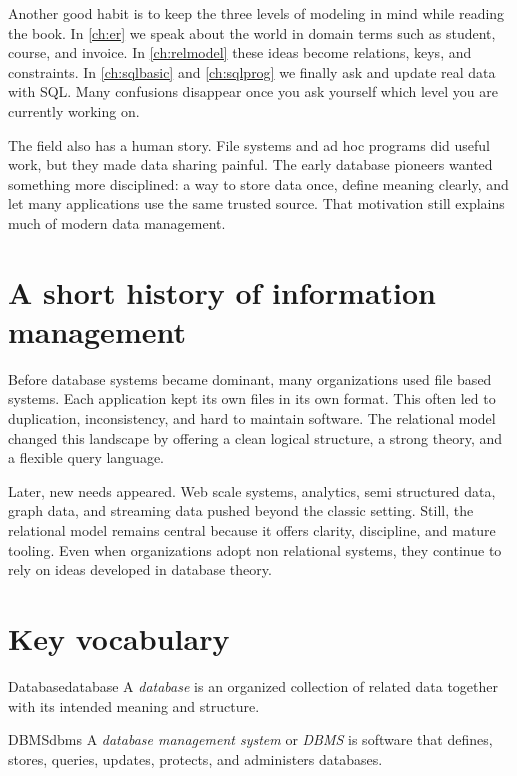 \documentclass[11pt,a4paper,openany]{book}
\begin{document}
Another good habit is to keep the three levels of modeling in mind while reading the book. In \cref{ch:er} we speak about the world in domain terms such as student, course, and invoice. In \cref{ch:relmodel} these ideas become relations, keys, and constraints. In \cref{ch:sqlbasic} and \cref{ch:sqlprog} we finally ask and update real data with SQL. Many confusions disappear once you ask yourself which level you are currently working on.

The field also has a human story. File systems and ad hoc programs did useful work, but they made data sharing painful. The early database pioneers wanted something more disciplined: a way to store data once, define meaning clearly, and let many applications use the same trusted source. That motivation still explains much of modern data management.

\section{A short history of information management}
Before database systems became dominant, many organizations used file based systems. Each application kept its own files in its own format. This often led to duplication, inconsistency, and hard to maintain software. The relational model changed this landscape by offering a clean logical structure, a strong theory, and a flexible query language.

Later, new needs appeared. Web scale systems, analytics, semi structured data, graph data, and streaming data pushed beyond the classic setting. Still, the relational model remains central because it offers clarity, discipline, and mature tooling. Even when organizations adopt non relational systems, they continue to rely on ideas developed in database theory.

\section{Key vocabulary}
\begin{definition}{Database}{database}
A \emph{database} is an organized collection of related data together with its intended meaning and structure.
\end{definition}

\begin{definition}{DBMS}{dbms}
A \emph{database management system} or \emph{DBMS} is software that defines, stores, queries, updates, protects, and administers databases.
\end{definition}
\end{document}
